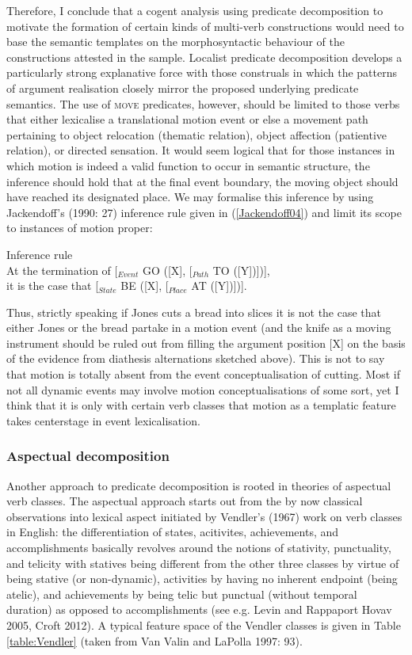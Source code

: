 Therefore, I conclude that a cogent analysis using predicate decomposition to motivate the formation of certain kinds of multi-verb constructions would need to base the semantic templates on the morphosyntactic behaviour of the constructions attested in the sample. Localist predicate decomposition develops a particularly strong explanative force with those construals in which the patterns of argument realisation closely mirror the proposed underlying predicate semantics. The use of \textsc{move} predicates, however, should be limited to those verbs that either lexicalise a translational motion event or else a movement path pertaining to object relocation (thematic relation), object affection (patientive relation), or directed sensation.
It would seem logical that for those instances in which motion is indeed a valid function to occur in semantic structure, the inference should hold that at the final event boundary, the moving object should have reached its designated place. We may formalise this inference by using Jackendoff's (1990: 27) inference rule given in (\ref{Jackendoff04}) and limit its scope to instances of motion proper:

\ea \label{Jackendoff04} Inference rule \\
At the termination of [$_{Event}$ GO ([X], [$_{Path}$ TO ([Y])])], \\
it is the case that [$_{State}$ BE ([X], [$_{Place}$ AT ([Y])])].
\z

Thus, strictly speaking if Jones cuts a bread into slices it is not the case that either Jones or the bread partake in a motion event (and the knife as a moving instrument should be ruled out from filling the argument position [X] on the basis of the evidence from diathesis alternations sketched above). This is not to say that motion is totally absent from the event conceptualisation of cutting. Most if not all dynamic events may involve motion conceptualisations of some sort, yet I think that it is only with certain verb classes that motion as a templatic feature takes centerstage in event lexicalisation.

\subsubsection{Aspectual decomposition}

Another approach to predicate decomposition is rooted in theories of aspectual verb classes. The aspectual approach starts out from the by now classical observations into lexical aspect initiated by Vendler's (1967) work on verb classes in English: the differentiation of states, acitivites, achievements, and accomplishments basically revolves around the notions of stativity, punctuality, and telicity with statives being different from the other three classes by virtue of being stative (or non-dynamic), activities by having no inherent endpoint (being atelic), and achievements by being telic but punctual (without temporal duration) as opposed to accomplishments (see e.g. Levin and Rappaport Hovav 2005, Croft 2012). A typical feature space of the Vendler classes is given in Table \ref{table:Vendler} (taken from Van Valin and LaPolla 1997: 93).

